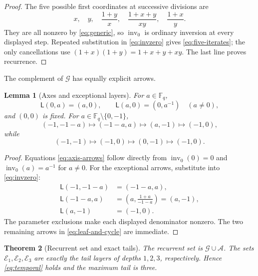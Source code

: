 \documentclass[10pt,a4paper]{amsart}
\newtheorem{theorem}{Theorem}[section]
\newtheorem{lemma}[theorem]{Lemma}
\theoremstyle{definition}
\theoremstyle{remark}
\newcommand{\F}{\mathbb F}
\newcommand{\G}{\mathcal G}
\newcommand{\A}{\mathcal A}
\newcommand{\E}{\mathcal E}
\newcommand{\Lyn}{\mathsf L}
\newcommand{\invz}{\operatorname{inv}_0}
\begin{document}
\begin{proof}
The five possible first coordinates at successive divisions are
\[
 x,\quad y,\quad \frac{1+y}{x},\quad
 \frac{1+x+y}{xy},\quad \frac{1+x}{y}.
\]
They are all nonzero by \eqref{eq:generic}, so $\invz$ is ordinary inversion
at every displayed step.  Repeated substitution in \eqref{eq:invzero} gives
\eqref{eq:five-iterates}; the only cancellations use
$(1+x)(1+y)=1+x+y+xy$.  The last line proves recurrence.
\end{proof}

The complement of $\G$ has equally explicit arrows.

\begin{lemma}[Axes and exceptional layers]\label{lem:arrows}
For $a\in\F_q$,
\begin{equation}\label{eq:axis-arrows}
 \Lyn(0,a)=(a,0),\qquad
 \Lyn(a,0)=(0,a^{-1})\quad(a\ne0),
\end{equation}
and $(0,0)$ is fixed.  For $a\in\F_q\setminus\{0,-1\}$,
\begin{equation}\label{eq:tail-chain}
 (-1,-1-a)\longmapsto(-1-a,a)
 \longmapsto(a,-1)\longmapsto(-1,0),
\end{equation}
while
\begin{equation}\label{eq:leaf-and-cycle}
 (-1,-1)\longmapsto(-1,0)
 \longmapsto(0,-1)\longmapsto(-1,0).
\end{equation}
\end{lemma}

\begin{proof}
Equations \eqref{eq:axis-arrows} follow directly from $\invz(0)=0$ and
$\invz(a)=a^{-1}$ for $a\ne0$.  For the exceptional arrows, substitute into
\eqref{eq:invzero}:
\begin{align*}
 \Lyn(-1,-1-a)&=(-1-a,a),\\
 \Lyn(-1-a,a)&=\left(a,\frac{1+a}{-1-a}\right)=(a,-1),\\
 \Lyn(a,-1)&=(-1,0).
\end{align*}
The parameter exclusions make each displayed denominator nonzero.  The two
remaining arrows in \eqref{eq:leaf-and-cycle} are immediate.
\end{proof}

\begin{theorem}[Recurrent set and exact tails]\label{thm:tails}
The recurrent set is $\G\cup\A$.  The sets $\E_1,\E_2,\E_3$ are exactly the
tail layers of depths $1,2,3$, respectively.  Hence
\eqref{eq:temporal} holds and the maximum tail is three.
\end{theorem}
\end{document}
